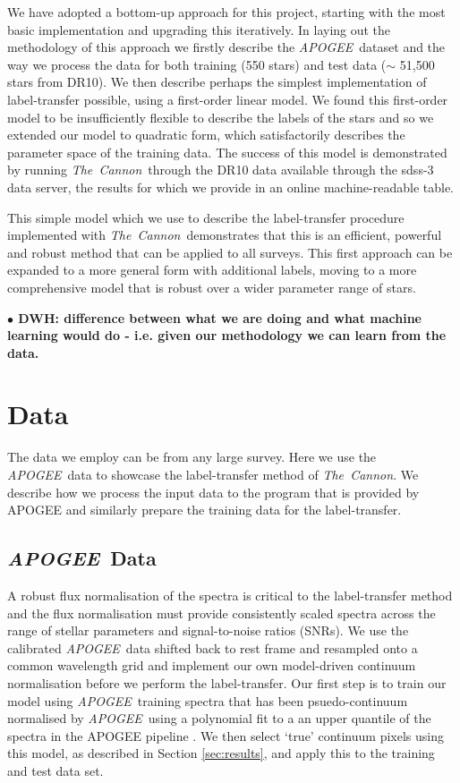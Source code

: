 \documentclass[12pt, preprint]{aastex}
\newcommand{\tc}{\textsl{The~Cannon}}
\newcommand{\apogee}{\textsl{APOGEE}}
\begin{document}
We have adopted a bottom-up approach for this project, starting with the most basic implementation and upgrading this iteratively.  In laying out the methodology of this approach we firstly describe the \apogee\ dataset and the way we process the data for both training (550 stars) and test data ($\sim$ 51,500 stars from DR10). We then describe perhaps the simplest implementation of label-transfer possible, using a first-order linear model. We found this first-order model to be insufficiently flexible to describe the labels of the stars and so we extended our model to quadratic form, which satisfactorily describes the parameter space of the training data. The success of this model is demonstrated by running \tc\ through the DR10 data available through the sdss-3 data server, the results for which we provide in an online machine-readable table. %

This simple model which we use to describe the label-transfer procedure implemented with  \tc\, demonstrates that this is an efficient, powerful and robust method that can be applied to all surveys. This first approach can be expanded to a more general form with additional labels, moving to a more comprehensive model that is robust over a wider parameter range of stars. 

\textbf{$\bullet$ DWH: difference between what we are doing and what machine learning would do - i.e. given our methodology we can learn from the data. }



\section{Data}

The data we employ can be from any large survey. Here we use the \apogee\ data to showcase the label-transfer method of \tc . We describe how we process the input data to the program that is provided by APOGEE and similarly prepare the training data for the label-transfer. 

\subsection{\apogee\ Data}

A robust flux normalisation of the spectra is critical to the label-transfer method and the flux normalisation must provide consistently scaled spectra across the range of stellar parameters and signal-to-noise ratios (SNRs). We use the calibrated \apogee\ data shifted back to rest frame and resampled onto a common wavelength grid and implement our own model-driven continuum normalisation before we perform the label-transfer. Our first step is to train our model using \apogee\ training spectra that has been psuedo-continuum normalised by \apogee\ using a polynomial fit to a an upper quantile of the spectra in the APOGEE pipeline \citep{Meszaros2013}. 
We then select  `true' continuum pixels using this model, as described in Section \ref{sec:results}, and apply this to the training and test data set. 
\end{document}
